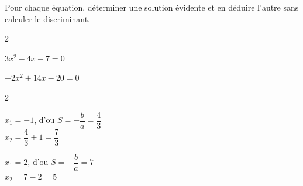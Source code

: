 \documentclass[12pt,a4paper]{article}  %
\begin{document}
\vspace{-0.3cm}

Pour chaque équation, déterminer une solution évidente et en déduire l'autre sans calculer le discriminant.
\begin{multicols}{2}
\begin{enumMet}
    \item $3x^2-4x-7=0$ 
    \item $-2x^2+14x-20=0$ 
\end{enumMet}
\end{multicols}

\begin{corrBox}
	\begin{multicols}{2}
		\begin{enumMet}
			\item $x_1=-1$, d'ou $S=-\dfrac{b}{a}=\dfrac{4}{3}$\\
			$x_2=\dfrac{4}{3}+1=\dfrac{7}{3}$
			\item $x_1=2$, d'ou $S=-\dfrac{b}{a}=7$\\
			$x_2=7-2=5$
		\end{enumMet}
	\end{multicols}
\end{corrBox}


%
%
%
%
\end{document}
